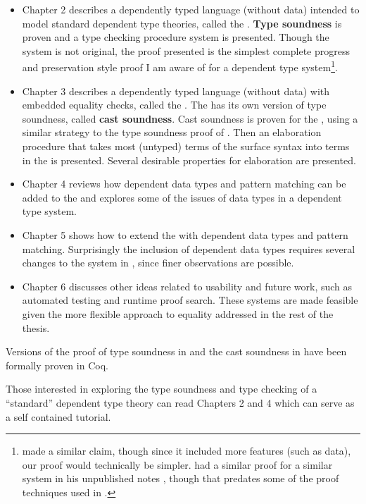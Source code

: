 \begin{itemize}
\item Chapter 2 describes a dependently typed language (without data) intended to model standard dependent type theories, called the \textbf{\slang{}}.
\textbf{Type soundness} is proven and a \bidir{} type checking procedure system is presented.
Though the system is not original, the proof presented is the simplest complete progress and preservation style proof I am aware of for a dependent type system\footnote{
  \cite{sjoberg2015dependently} made a similar claim, though since it included more features (such as data), our proof would technically be simpler.
  \MartinL{} had a similar proof for a similar system in his unpublished notes \cite{Martin-Lof-1971}, though that predates some of the proof techniques used in .
}.
\item Chapter 3 describes a dependently typed language (without data) with embedded equality checks, called the \textbf{\clang{}}.
The \clang{} has its own version of type soundness, called \textbf{cast soundness}.
Cast soundness is proven for the \clang{}, using a similar strategy to the type soundness proof of .
Then an elaboration procedure that takes most (untyped) terms of the surface syntax into terms in the \clang{} is presented.
Several desirable properties for elaboration are presented. %
\item Chapter 4 reviews how dependent data types and pattern matching can be added to the \slang{} and explores some of the issues of data types in a dependent type system.
\item Chapter 5 shows how to extend the \clang{} with dependent data types and pattern matching.
Surprisingly the inclusion of dependent data types requires several changes to the system in , since finer observations are possible.
\item Chapter 6 discusses other ideas related to usability and future work, such as automated testing and runtime proof search.
These systems are made feasible given the more flexible approach to equality addressed in the rest of the thesis.
\end{itemize}
Versions of the proof of type soundness in  and the cast soundness in  have been formally proven in Coq.

Those interested in exploring the type soundness and type checking of a ``standard'' dependent type theory can read Chapters 2 and 4 which can serve as a self contained tutorial.
